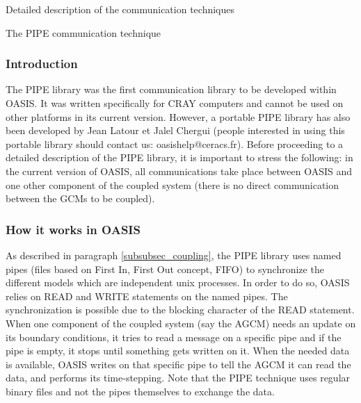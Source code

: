 \newpage
\begin{section}{Detailed description of the communication techniques}
\label{app_communication}

\begin{subsection}{The PIPE communication technique}
\label{subsec_pipecomm}

\subsubsection{Introduction}

The PIPE library was the first communication library to be developed
within OASIS. It was written specifically for CRAY computers and cannot
be used on other platforms in its current version. However, a portable PIPE
library has also been developed by Jean Latour et Jalel Chergui 
(people interested in using this portable library should contact us:
oasishelp@ceracs.fr). Before proceeding to a detailed
description of the PIPE library, it is important to stress the following:
in the current version of OASIS, all
communications take place between OASIS and one other component of the coupled
system (there is no direct communication between the GCMs to be coupled).


\subsubsection{How it works in OASIS}

As described in paragraph \ref{subsubsec_coupling}, the PIPE library uses 
named pipes (files based
on First In, First Out concept, FIFO) to synchronize the 
different models which are independent unix processes. In order to do so, 
OASIS relies on READ and WRITE statements on the named pipes. The 
synchronization is possible due to the blocking character of the READ 
statement. When one component of the coupled system (say the AGCM)
needs an update on its
boundary conditions, it tries to read a message on a specific pipe and
if the pipe is empty, it stops until something gets written on it. 
When the needed data is available, OASIS writes on that specific pipe to tell 
the AGCM it can read the data, and performs its time-stepping. 
Note that the PIPE technique uses regular binary files and not the pipes
themselves to exchange the data. 


\end{subsection}
\end{section}
